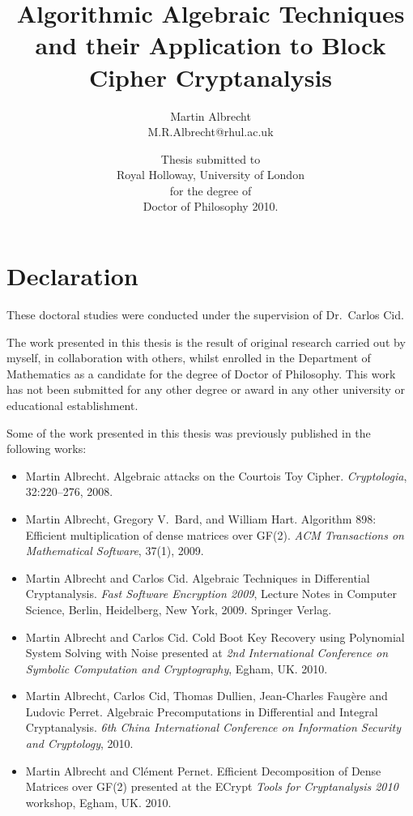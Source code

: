 \documentclass[a4paper,11pt]{report}
\title{Algorithmic Algebraic Techniques and their Application to Block Cipher Cryptanalysis}
\author{Martin Albrecht\\M.R.Albrecht@rhul.ac.uk}
\date{\vspace{8cm}Thesis submitted to\\Royal Holloway, University of London\\ for the degree of\\Doctor of Philosophy 2010.}
\theoremstyle{definition}
\begin{document}
\maketitle


\newpage

\addtocounter{page}{1}

\chapter*{Declaration}
\thispagestyle{empty}
These doctoral studies were conducted under the supervision of Dr.\ Carlos Cid.

The work presented in this thesis is the result of original research carried out by myself, in collaboration with others, whilst enrolled in the Department of Mathematics as a candidate for the degree of Doctor of Philosophy. This work has not been submitted for any other degree or award in any other university or educational establishment.

Some of the work presented in this thesis was previously published in the following works:
\begin{itemize}
 \item Martin Albrecht. Algebraic attacks on the Courtois Toy Cipher. \emph{Cryptologia}, 32:220–276, 2008.
 \item Martin Albrecht, Gregory V.\ Bard, and William Hart. Algorithm 898: Efficient multiplication of dense matrices over GF(2). \emph{ACM Transactions on Mathematical Software}, 37(1), 2009.
 \item Martin Albrecht and Carlos Cid. Algebraic Techniques in Differential Cryptanalysis. \emph{Fast Software Encryption 2009}, Lecture Notes in Computer Science, Berlin, Heidelberg, New York, 2009. Springer Verlag.
\item Martin Albrecht and Carlos Cid. Cold Boot Key Recovery using Polynomial System Solving with Noise presented at \emph{2nd International Conference on Symbolic Computation and Cryptography}, Egham, UK. 2010.
\item Martin Albrecht, Carlos Cid, Thomas Dullien, Jean-Charles Faugère and Ludovic Perret. Algebraic Precomputations in Differential and Integral Cryptanalysis. \emph{6th China International Conference on Information Security and Cryptology}, 2010.
\item Martin Albrecht and Clément Pernet. Efficient Decomposition of Dense Matrices over GF(2) presented at the ECrypt \emph{Tools for Cryptanalysis 2010} workshop, Egham, UK. 2010.
\end{itemize}
\end{document}

